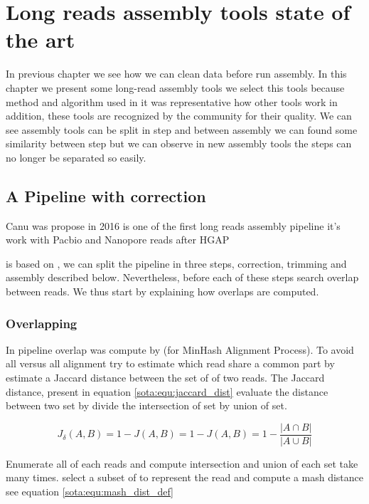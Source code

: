 \documentclass[main]{subfiles}
\begin{document}
\chapter{Long reads assembly tools state of the art}\label{chapter:sota}

In previous chapter we see how we can clean data before run assembly. In this chapter we present some long-read assembly tools we select this tools because method and algorithm used in it was representative how other tools work in addition, these tools are recognized by the community for their quality. We can see assembly tools can be split in step and between assembly we can found some similarity between step but we can observe in new assembly tools the steps can no longer be separated so easily.

\section{A Pipeline with correction \canu} \label{section:sota:canu}

Canu \cite{canu} was propose in 2016 is one of the first long reads assembly pipeline it's work with Pacbio and Nanopore reads after HGAP \cite{hgap}

\canu is based on  \cite{celera_first, celera_second}, we can split the \canu pipeline in three steps, correction, trimming and assembly described below. Nevertheless, before each of these steps \canu search overlap between reads. We thus start by explaining how overlaps are computed.

\subsection{Overlapping} \label{subsec:sota:canu:overlapping}

In \canu pipeline overlap was compute by \mhap (for MinHash Alignment Process). To avoid all versus all alignment \mhap try to estimate which read share a common part by estimate a Jaccard distance between the set of \kmers of two reads. The Jaccard distance, present in equation \ref{sota:equ:jaccard_dist} evaluate the distance between two set by divide the intersection of set by union of set.

\begin{equation}
J_{\delta}(A,B) = 1 - J(A,B) = 1 -  J(A,B) = 1 - \frac{|A \cap B|}{|A \cup B|}
\label{sota:equ:jaccard_dist}
\end{equation}

Enumerate all \kmers of each reads and compute intersection and union of each set take many times. \mhap select a subset of \kmers to represent the read and compute a mash distance \cite{mash_distance} see equation \ref{sota:equ:mash_dist_def} 
\end{document}
